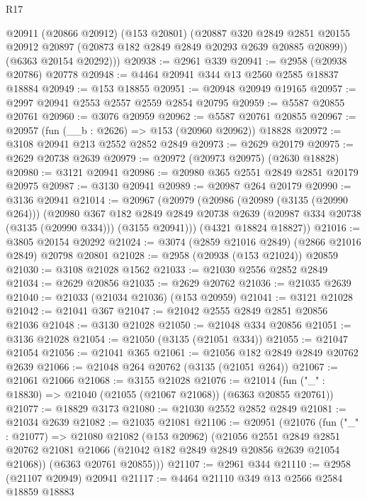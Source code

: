 \begin{lexlean}{R17}
\begin{coremodule}
      @20911
        (@20866 @20912)
        (@153 @20801)
        (@20887
          @320
          @2849
          @2851
          @20155
          @20912
          @20897
          (@20873 @182 @2849 @2849 @20293 @2639 @20885 @20899))
        (@6363 @20154 @20292)))
@20938 := @2961 @339
@20941 := @2958 (@20938 @20786) @20778
@20948 := @4464 @20941 @344 @13 @2560 @2585 @18837 @18884
@20949 := @153 @18855
@20951 := @20948 @20949 @19165
@20957 := @2997 @20941 @2553 @2557 @2559 @2854 @20795
@20959 := @5587 @20855 @20761
@20960 := @3076 @20959
@20962 := @5587 @20761 @20855
@20967 := @20957 (fun (__b : @2626) => @153 (@20960 @20962)) @18828
@20972 := @3108 @20941 @213 @2552 @2852 @2849
@20973 := @2629 @20179
@20975 := @2629 @20738 @2639
@20979 := @20972 (@20973 @20975) (@2630 @18828)
@20980 := @3121 @20941
@20986 := @20980 @365 @2551 @2849 @2851 @20179 @20975
@20987 := @3130 @20941
@20989 := @20987 @264 @20179
@20990 := @3136 @20941
@21014 := @20967
    (@20979
      (@20986
        (@20989 (@3135 (@20990 @264)))
        (@20980
          @367
          @182
          @2849
          @2849
          @20738
          @2639
          (@20987 @334 @20738 (@3135 (@20990 @334)))
          (@3155 @20941)))
      (@4321 @18824 @18827))
@21016 := @3805 @20154 @20292
@21024 := @3074 (@2859 @21016 @2849) (@2866 @21016 @2849) @20798 @20801
@21028 := @2958 (@20938 (@153 @21024)) @20859
@21030 := @3108 @21028 @1562
@21033 := @21030 @2556 @2852 @2849
@21034 := @2629 @20856
@21035 := @2629 @20762
@21036 := @21035 @2639
@21040 := @21033 (@21034 @21036) (@153 @20959)
@21041 := @3121 @21028
@21042 := @21041 @367
@21047 := @21042 @2555 @2849 @2851 @20856 @21036
@21048 := @3130 @21028
@21050 := @21048 @334 @20856
@21051 := @3136 @21028
@21054 := @21050 (@3135 (@21051 @334))
@21055 := @21047 @21054
@21056 := @21041 @365
@21061 := @21056 @182 @2849 @2849 @20762 @2639
@21066 := @21048 @264 @20762 (@3135 (@21051 @264))
@21067 := @21061 @21066
@21068 := @3155 @21028
@21076 := @21014 (fun ("_" : @18830) => @21040 (@21055 (@21067 @21068)) (@6363 @20855 @20761))
@21077 := @18829 @3173
@21080 := @21030 @2552 @2852 @2849
@21081 := @21034 @2639
@21082 := @21035 @21081
@21106 := @20951
    (@21076
      (fun ("_" : @21077) =>
      @21080
        @21082
        (@153 @20962)
        (@21056
          @2551
          @2849
          @2851
          @20762
          @21081
          @21066
          (@21042 @182 @2849 @2849 @20856 @2639 @21054 @21068))
        (@6363 @20761 @20855)))
@21107 := @2961 @344
@21110 := @2958 (@21107 @20949) @20941
@21117 := @4464 @21110 @349 @13 @2566 @2584 @18859 @18883

\end{coremodule}
\end{lexlean}
